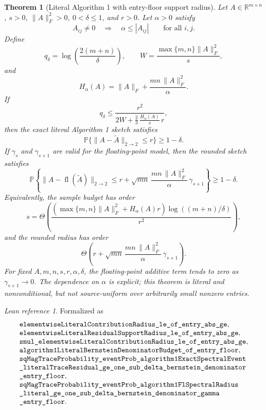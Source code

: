 \documentclass[11pt]{article}
\newcommand{\fl}{\operatorname{fl}}
\newcommand{\Prob}{\mathbb{P}}
\newcommand{\R}{\mathbb{R}}
\newcommand{\lean}[1]{\texttt{\detokenize{#1}}}
\newtheorem{theorem}{Theorem}
\theoremstyle{definition}
\theoremstyle{remark}
\newtheorem*{leanref}{Lean reference}
\begin{document}
\begin{theorem}[Literal Algorithm 1 with entry-floor support radius]
Let \(A\in\R^{m\times n}\), \(s>0\), \(\|A\|_F^2>0\),
\(0<\delta\le1\), and \(r>0\).  Let \(\alpha>0\) satisfy
\[
  A_{ij}\ne0\quad\Longrightarrow\quad \alpha\le |A_{ij}|
  \qquad\text{for all }i,j .
\]
Define
\[
  q_\delta=\log\!\left(\frac{2(m+n)}{\delta}\right),
  \qquad
  W=\frac{\max\{m,n\}\|A\|_F^2}{s},
\]
and
\[
  H_\alpha(A)=
    \|A\|_F+\frac{mn\,\|A\|_F^2}{\alpha}.
\]
If
\[
  q_\delta
  \le
  \frac{r^2}{2W+\frac23\,\frac{H_\alpha(A)}{s}\,r},
\]
then the exact literal Algorithm 1 sketch satisfies
\[
  \Prob\{\|A-\widetilde A\|_{2\to2}\le r\}\ge1-\delta .
\]
If \(\gamma_s\) and \(\gamma_{s+1}\) are valid for the floating-point model,
then the rounded sketch satisfies
\[
  \Prob\!\left\{
    \|A-\fl(\widetilde A)\|_{2\to2}
    \le
    r+\sqrt{mn}\,
      \frac{mn\,\|A\|_F^2}{\alpha}\,
      \gamma_{s+1}
  \right\}
  \ge1-\delta .
\]
Equivalently, the sample budget has order
\[
  s=
  \Theta\!\left(
    \frac{
      (\max\{m,n\}\|A\|_F^2+H_\alpha(A)r)
      \log((m+n)/\delta)}
      {r^2}
  \right),
\]
and the rounded radius has order
\[
  \Theta\!\left(
    r+
    \sqrt{mn}\,\frac{mn\,\|A\|_F^2}{\alpha}\,\gamma_{s+1}
  \right).
\]
For fixed \(A,m,n,s,r,\alpha,\delta\), the floating-point additive term tends
to zero as \(\gamma_{s+1}\to0\).  The dependence on \(\alpha\) is explicit;
this theorem is literal and nonconditional, but not source-uniform over
arbitrarily small nonzero entries.
\end{theorem}

\begin{leanref}
Formalized as
\[
\begin{array}{l}
  \lean{elementwiseLiteralContributionRadius_le_of_entry_abs_ge},\\
  \lean{elementwiseLiteralResidualSupportRadius_le_of_entry_abs_ge},\\
  \lean{smul_elementwiseLiteralContributionRadius_le_of_entry_abs_ge},\\
  \lean{algorithm1LiteralBernsteinDenominatorBudget_of_entry_floor},\\
  \lean{sqMagTraceProbability_eventProb_algorithm1ExactSpectralEvent}\\
  \lean{_literalTraceResidual_ge_one_sub_delta_bernstein_denominator}\\
  \lean{_entry_floor},\\
  \lean{sqMagTraceProbability_eventProb_algorithm1FlSpectralRadius}\\
  \lean{_literal_ge_one_sub_delta_bernstein_denominator_gamma}\\
  \lean{_entry_floor}.
\end{array}
\]
\end{leanref}
\end{document}
